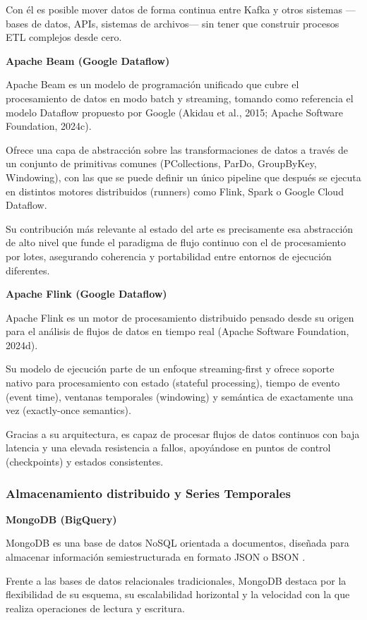 \documentclass[12pt,a4paper]{article}
\begin{document}
Con él es posible mover datos de forma continua entre Kafka y otros sistemas ---bases de datos, APIs, sistemas de archivos--- sin tener que construir procesos ETL complejos desde cero.

\textbf{Apache Beam (Google Dataflow)}

Apache Beam es un modelo de programación unificado que cubre el procesamiento de datos en modo batch y streaming, tomando como referencia el modelo Dataflow propuesto por Google (Akidau et al., 2015; Apache Software Foundation, 2024c).

Ofrece una capa de abstracción sobre las transformaciones de datos a través de un conjunto de primitivas comunes (PCollections, ParDo, GroupByKey, Windowing), con las que se puede definir un único pipeline que después se ejecuta en distintos motores distribuidos (runners) como Flink, Spark o Google Cloud Dataflow.

Su contribución más relevante al estado del arte es precisamente esa abstracción de alto nivel que funde el paradigma de flujo continuo con el de procesamiento por lotes, asegurando coherencia y portabilidad entre entornos de ejecución diferentes.

\textbf{Apache Flink (Google Dataflow)}

Apache Flink es un motor de procesamiento distribuido pensado desde su origen para el análisis de flujos de datos en tiempo real (Apache Software Foundation, 2024d).

Su modelo de ejecución parte de un enfoque streaming-first y ofrece soporte nativo para procesamiento con estado (stateful processing), tiempo de evento (event time), ventanas temporales (windowing) y semántica de exactamente una vez (exactly-once semantics).

Gracias a su arquitectura, es capaz de procesar flujos de datos continuos con baja latencia y una elevada resistencia a fallos, apoyándose en puntos de control (checkpoints) y estados consistentes.

\subsubsection{Almacenamiento distribuido y Series Temporales}

\textbf{MongoDB (BigQuery)}

MongoDB es una base de datos NoSQL orientada a documentos, diseñada para almacenar información semiestructurada en formato JSON o BSON \parencite{mongodb2024manual}.

Frente a las bases de datos relacionales tradicionales, MongoDB destaca por la flexibilidad de su esquema, su escalabilidad horizontal y la velocidad con la que realiza operaciones de lectura y escritura.
\end{document}
